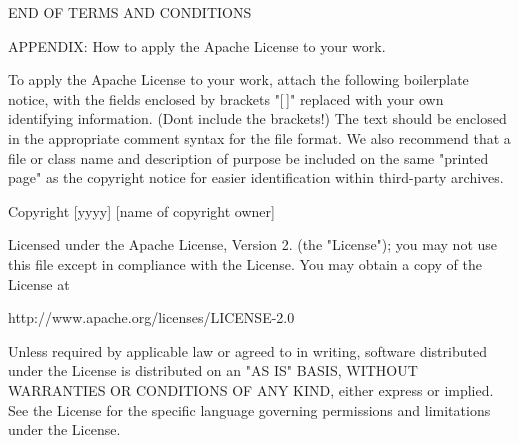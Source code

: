 END OF TERMS AND CONDITIONS

APPENDIX\+: How to apply the Apache License to your work.

To apply the Apache License to your work, attach the following boilerplate notice, with the fields enclosed by brackets "{}\mbox{[}$\,$\mbox{]}"{} replaced with your own identifying information. (Don\textquotesingle{}t include the brackets!) The text should be enclosed in the appropriate comment syntax for the file format. We also recommend that a file or class name and description of purpose be included on the same "{}printed page"{} as the copyright notice for easier identification within third-\/party archives.

Copyright \mbox{[}yyyy\mbox{]} \mbox{[}name of copyright owner\mbox{]}

Licensed under the Apache License, Version 2. (the "{}\+License"{}); you may not use this file except in compliance with the License. You may obtain a copy of the License at \begin{DoxyVerb}http://www.apache.org/licenses/LICENSE-2.0
\end{DoxyVerb}
 Unless required by applicable law or agreed to in writing, software distributed under the License is distributed on an "{}\+AS IS"{} BASIS, WITHOUT WARRANTIES OR CONDITIONS OF ANY KIND, either express or implied. See the License for the specific language governing permissions and limitations under the License.

 